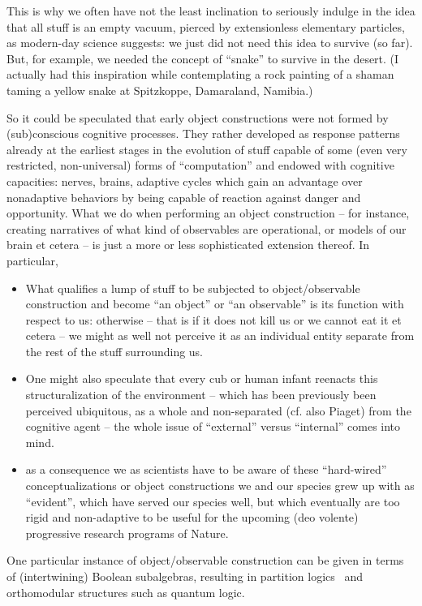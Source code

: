 This is why we often have not the least inclination to seriously indulge
in the idea that all stuff is an empty vacuum, pierced by extensionless elementary particles,
as modern-day science suggests: we just did not need this idea to survive (so far).
But, for example, we needed the concept of ``snake'' to survive in the desert.
(I actually had this inspiration while contemplating a rock painting of a shaman
taming a yellow snake at Spitzkoppe, Damaraland, Namibia.)

So it could be speculated that early object constructions were not formed by (sub)conscious cognitive processes.
They rather developed as response patterns already at the earliest stages in the evolution of stuff capable of some
(even very restricted, non-universal) forms of ``computation'' and endowed with cognitive capacities:
nerves, brains, adaptive cycles which gain an advantage over
nonadaptive behaviors by being capable of reaction against danger and opportunity.
What we do when performing an object construction -- for instance, creating narratives of
what kind of observables are operational, or models of our brain et cetera --
is just a more or less sophisticated extension thereof.
In particular,
\begin{itemize}
\item What qualifies a lump of stuff to be subjected to object/observable construction and become ``an object'' or ``an observable''
is its function with respect to us: otherwise -- that is if it does not kill us or we cannot eat it et cetera --
we might as well not perceive it as an individual entity separate from the rest of the stuff surrounding us.

\item One might also speculate that every cub or human infant reenacts this structuralization of the environment
-- which has been previously been perceived ubiquitous, as a whole and non-separated (cf. also Piaget) from the cognitive agent
-- the whole issue of ``external'' versus ``internal'' comes into mind.

\item as a consequence we as scientists have to be aware of these ``hard-wired''
conceptualizations or object constructions we and our species grew up with as ``evident'',
which have served our species well, but which eventually are too rigid and non-adaptive to be useful for the upcoming (deo volente) progressive research programs of Nature.
\end{itemize}

One particular instance of object/observable construction can be given in terms of (intertwining) Boolean subalgebras,
resulting in partition logics~\cite{svozil-2018-b} and orthomodular structures such as quantum logic.

